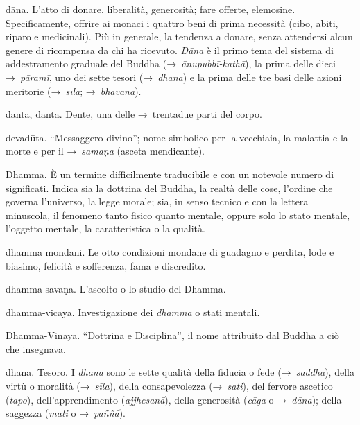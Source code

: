 \begin{glossarydescription}

\item[dāna.] L'atto di donare, liberalità, generosità; fare offerte,
  elemosine. Specificamente, offrire ai monaci i quattro beni di prima necessità
  (cibo, abiti, riparo e medicinali). Più in generale, la tendenza a donare,
  senza attendersi alcun genere di ricompensa da chi ha ricevuto. \emph{Dāna} è
  il primo tema del sistema di addestramento graduale del Buddha
  (→~\emph{ānupubbī-kathā}), la prima delle dieci →~\emph{pāramī}, uno dei sette
  tesori (→~\emph{dhana}) e la prima delle tre basi delle azioni meritorie
  (→~\emph{sīla}; →~\emph{bhāvanā}).

\item[danta, dantā.] Dente, una delle →~trentadue parti del
  corpo.

\item[devadūta.] ``Messaggero divino''; nome simbolico per la vecchiaia,
  la malattia e la morte e per il →~\emph{samaṇa} (asceta mendicante).

\item[Dhamma.]\label{glossary-dhamma} È un termine difficilmente traducibile e con un notevole
  numero di significati. Indica sia la dottrina del Buddha, la realtà delle
  cose, l'ordine che governa l'universo, la legge morale; sia, in senso tecnico
  e con la lettera minuscola, il fenomeno tanto fisico quanto mentale, oppure
  solo lo stato mentale, l'oggetto mentale, la caratteristica o la qualità.

\item[dhamma mondani.] Le otto condizioni mondane di guadagno e perdita, lode e
  biasimo, felicità e sofferenza, fama e discredito.

\item[dhamma-savaṇa.] L'ascolto o lo studio del Dhamma.

\item[dhamma-vicaya.] Investigazione dei \emph{dhamma} o stati mentali.

\item[Dhamma-Vinaya.] ``Dottrina e Disciplina'', il nome attribuito dal
  Buddha a ciò che insegnava.

\item[dhana.] Tesoro. I \emph{dhana} sono le sette qualità della fiducia o
  fede (→~\emph{saddhā}), della virtù o moralità (→~\emph{sīla}), della
  consapevolezza (→~\emph{sati}), del fervore ascetico (\emph{tapo}),
  dell'apprendimento (\emph{ajjhesanā}), della generosità (\emph{cāga} o
  →~\emph{dāna}); della saggezza (\emph{mati} o →~\emph{paññā}).


\end{glossarydescription}
